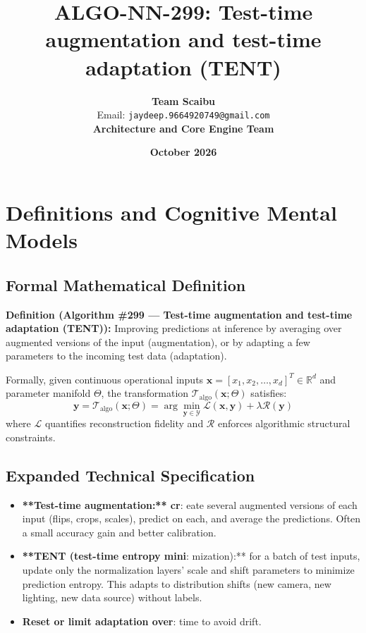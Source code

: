 \documentclass[11pt,a4paper]{article}
\title{\textbf{ALGO-NN-299: Test-time augmentation and test-time adaptation (TENT)}}
\author{\textbf{Team Scaibu} \\ \small Email: \texttt{jaydeep.9664920749@gmail.com} \\ \small \textbf{Architecture and Core Engine Team}}
\date{\textbf{October 2026}}
\theoremstyle{definition}
\begin{document}
\maketitle

\section{Definitions and Cognitive Mental Models}

\subsection{Formal Mathematical Definition}
\textbf{Definition (Algorithm \#299 --- Test-time augmentation and test-time adaptation (TENT)):}
Improving predictions at inference by averaging over augmented versions of the input (augmentation), or by adapting a few parameters to the incoming test data (adaptation).

Formally, given continuous operational inputs $\mathbf{x} = [x_1, x_2, \dots, x_d]^T \in \mathbb{R}^d$ and parameter manifold $\Theta$, the transformation $\mathcal{T}_{\text{algo}}(\mathbf{x}; \Theta)$ satisfies:
{\boldmath
\begin{equation}
\mathbf{y} = \mathcal{T}_{\text{algo}}(\mathbf{x}; \Theta) = \arg\min_{\mathbf{y} \in \mathcal{Y}} \mathcal{L}(\mathbf{x}, \mathbf{y}) + \lambda \mathcal{R}(\mathbf{y})
\end{equation}
}
where $\mathcal{L}$ quantifies reconstruction fidelity and $\mathcal{R}$ enforces algorithmic structural constraints.

\subsection{Expanded Technical Specification}
\begin{itemize}
\item \textbf{**Test-time augmentation:** cr}: eate several augmented versions of each input (flips, crops, scales), predict on each, and average the predictions. Often a small accuracy gain and better calibration.
\item \textbf{**TENT (test-time entropy mini}: mization):** for a batch of test inputs, update only the normalization layers' scale and shift parameters to minimize prediction entropy. This adapts to distribution shifts (new camera, new lighting, new data source) without labels.
\item \textbf{Reset or limit adaptation over}:  time to avoid drift.
\end{itemize}
\end{document}
